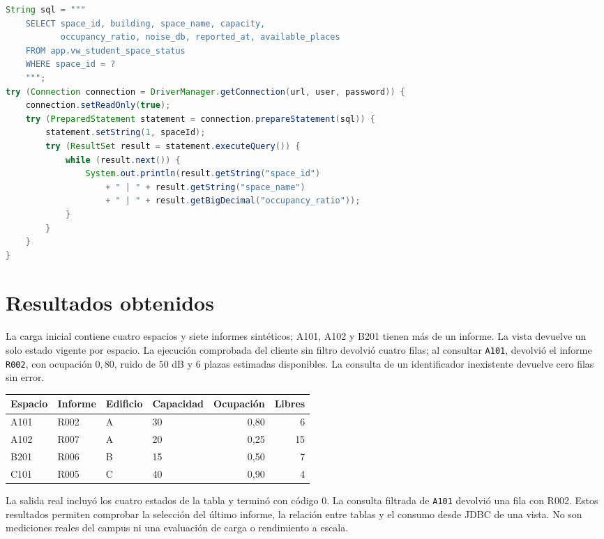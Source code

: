 \documentclass[a4paper,12pt]{article}
\begin{document}
\begin{lstlisting}[language=Java,caption={Consulta parametrizada de la vista externa}]
String sql = """
    SELECT space_id, building, space_name, capacity,
           occupancy_ratio, noise_db, reported_at, available_places
    FROM app.vw_student_space_status
    WHERE space_id = ?
    """;
try (Connection connection = DriverManager.getConnection(url, user, password)) {
    connection.setReadOnly(true);
    try (PreparedStatement statement = connection.prepareStatement(sql)) {
        statement.setString(1, spaceId);
        try (ResultSet result = statement.executeQuery()) {
            while (result.next()) {
                System.out.println(result.getString("space_id")
                    + " | " + result.getString("space_name")
                    + " | " + result.getBigDecimal("occupancy_ratio"));
            }
        }
    }
}
\end{lstlisting}

\section{Resultados obtenidos}
La carga inicial contiene cuatro espacios y siete informes sintéticos; A101, A102 y B201 tienen más de un informe. La vista devuelve un solo estado vigente por espacio. La ejecución comprobada del cliente sin filtro devolvió cuatro filas; al consultar \texttt{A101}, devolvió el informe \texttt{R002}, con ocupación \(0{,}80\), ruido de \(50\) dB y 6 plazas estimadas disponibles. La consulta de un identificador inexistente devuelve cero filas sin error.

\begin{center}\small
\begin{tabular}{llllrr}\toprule
Espacio & Informe & Edificio & Capacidad & Ocupación & Libres \\\midrule
A101 & R002 & A & 30 & 0,80 & 6 \\
A102 & R007 & A & 20 & 0,25 & 15 \\
B201 & R006 & B & 15 & 0,50 & 7 \\
C101 & R005 & C & 40 & 0,90 & 4 \\
\bottomrule
\end{tabular}
\end{center}

La salida real incluyó los cuatro estados de la tabla y terminó con código 0. La consulta filtrada de \texttt{A101} devolvió una fila con R002. Estos resultados permiten comprobar la selección del último informe, la relación entre tablas y el consumo desde JDBC de una vista. No son mediciones reales del campus ni una evaluación de carga o rendimiento a escala.
\end{document}
